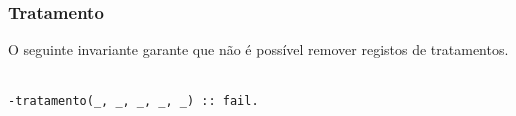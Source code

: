 \subsubsection*{Tratamento}
O seguinte invariante garante que não é possível remover registos de tratamentos.
\
\begin{lstlisting}[caption={Invariante de remoção relativo ao predicado \texttt{tratamento}}]
% Nao permite a remocao de registos de tratamentos
-tratamento(_, _, _, _, _) :: fail.
\end{lstlisting}